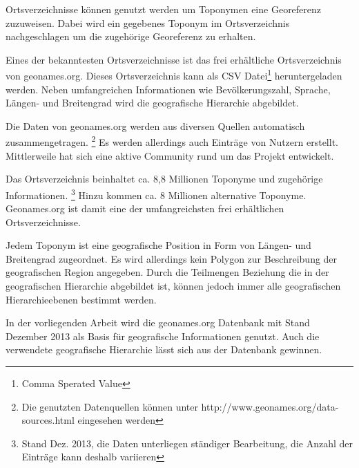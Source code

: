 			Ortsverzeichnisse können genutzt werden um Toponymen eine Georeferenz zuzuweisen. 
			Dabei wird ein gegebenes Toponym im Ortsverzeichnis nachgeschlagen um die zugehörige Georeferenz zu erhalten.  
		
			Eines der bekanntesten Ortsverzeichnisse ist das frei erhältliche Ortsverzeichnis von geonames.org. 
			Dieses Ortsverzeichnis kann als CSV Datei\footnote{Comma Sperated Value} heruntergeladen werden.
			Neben umfangreichen Informationen wie Bevölkerungszahl, Sprache, Längen- und Breitengrad wird die geografische Hierarchie abgebildet.

			Die Daten von geonames.org werden aus diversen Quellen automatisch zusammengetragen. \footnote{Die genutzten Datenquellen können unter http://www.geonames.org/data-sources.html eingesehen werden} 
			Es werden allerdings auch Einträge von Nutzern erstellt. 
			Mittlerweile hat sich eine aktive Community rund um das Projekt entwickelt. 

			Das Ortsverzeichnis beinhaltet ca. 8,8 Millionen Toponyme und zugehörige Informationen. \footnote{Stand Dez. 2013, die Daten unterliegen ständiger Bearbeitung, die Anzahl der Einträge kann deshalb variieren} 
			Hinzu kommen ca. 8 Millionen alternative Toponyme.
			Geonames.org ist damit eine der umfangreichsten frei erhältlichen Ortsverzeichnisse.

			Jedem Toponym ist eine geografische Position in Form von Längen- und Breitengrad zugeordnet. 
			Es wird allerdings kein Polygon zur Beschreibung der geografischen Region angegeben.
			Durch die Teilmengen Beziehung die in der geografischen Hierarchie abgebildet ist, können jedoch immer alle geografischen Hierarchieebenen bestimmt werden.

			In der vorliegenden Arbeit wird die geonames.org Datenbank mit Stand Dezember 2013 als Basis für geografische Informationen genutzt.
			Auch die verwendete geografische Hierarchie lässt sich aus der Datenbank gewinnen.

		

	

	
